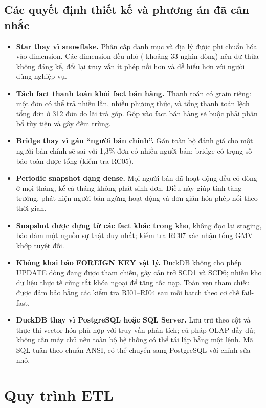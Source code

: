 \documentclass[a4paper]{article}
\DeclareRobustCommand{\code}[1]{\texttt{\detokenize{#1}}}
\begin{document}
\subsection{Các quyết định thiết kế và phương án đã cân nhắc}
\label{sec:decisions}
\begin{itemize}
    \item \textbf{Star thay vì snowflake.} Phân cấp danh mục và địa lý được phi chuẩn hóa vào dimension. Các dimension đều nhỏ (\code{dim_product} khoảng 33 nghìn dòng) nên dư thừa không đáng kể, đổi lại truy vấn ít phép nối hơn và dễ hiểu hơn với người dùng nghiệp vụ.
    \item \textbf{Tách fact thanh toán khỏi fact bán hàng.} Thanh toán có grain riêng: một đơn có thể trả nhiều lần, nhiều phương thức, và tổng thanh toán lệch tổng đơn ở 312 đơn do lãi trả góp. Gộp vào fact bán hàng sẽ buộc phải phân bổ tùy tiện và gây đếm trùng.
    \item \textbf{Bridge thay vì gán ``người bán chính''.} Gán toàn bộ đánh giá cho một người bán chính sẽ sai với 1,3\% đơn có nhiều người bán; bridge có trọng số bảo toàn được tổng (kiểm tra RC05).
    \item \textbf{Periodic snapshot dạng dense.} Mọi người bán đã hoạt động đều có dòng ở mọi tháng, kể cả tháng không phát sinh đơn. Điều này giúp tính tăng trưởng, phát hiện người bán ngừng hoạt động và đơn giản hóa phép nối theo thời gian.
    \item \textbf{Snapshot được dựng từ các fact khác trong kho}, không đọc lại staging, bảo đảm một nguồn sự thật duy nhất; kiểm tra RC07 xác nhận tổng GMV khớp tuyệt đối.
    \item \textbf{Không khai báo FOREIGN KEY vật lý.} DuckDB không cho phép UPDATE dòng đang được tham chiếu, gây cản trở SCD1 và SCD6; nhiều kho dữ liệu thực tế cũng tắt khóa ngoại để tăng tốc nạp. Toàn vẹn tham chiếu được đảm bảo bằng các kiểm tra RI01--RI04 sau mỗi batch theo cơ chế fail-fast.
    \item \textbf{DuckDB thay vì PostgreSQL hoặc SQL Server.} Lưu trữ theo cột và thực thi vector hóa phù hợp với truy vấn phân tích; cú pháp OLAP đầy đủ; không cần máy chủ nên toàn bộ hệ thống có thể tái lập bằng một lệnh. Mã SQL tuân theo chuẩn ANSI, có thể chuyển sang PostgreSQL với chỉnh sửa nhỏ.
\end{itemize}

\section{Quy trình ETL}
\end{document}
